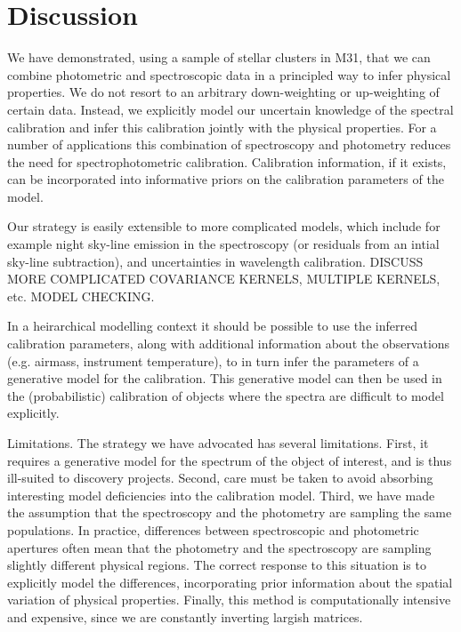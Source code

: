 \documentclass[iop,numberedappendix]{emulateapj}
\begin{document}
\section{Discussion}

We have demonstrated, using a sample of stellar clusters in M31, that
we can combine photometric and spectroscopic data in a principled way
to infer physical properties.  We do not resort to an arbitrary
down-weighting or up-weighting of certain data. Instead, we explicitly
model our uncertain knowledge of the spectral calibration and infer
this calibration jointly with the physical properties. For a number of
applications this combination of spectroscopy and photometry reduces
the need for spectrophotometric calibration.  Calibration information,
if it exists, can be incorporated into informative priors on the
calibration parameters of the model.

Our strategy is easily extensible to more complicated models, which
include for example night sky-line emission in the spectroscopy (or
residuals from an intial sky-line subtraction), and uncertainties in
wavelength calibration. {\color{blue} DISCUSS MORE COMPLICATED
COVARIANCE KERNELS, MULTIPLE KERNELS, etc.  MODEL CHECKING.}

In a heirarchical modelling context it should be possible to use the
inferred calibration parameters, along with additional information
about the observations (e.g. airmass, instrument temperature), to in
turn infer the parameters of a generative model for the
calibration. This generative model can then be used in the
(probabilistic) calibration of objects where the spectra are difficult
to model explicitly.

Limitations.  The strategy we have advocated has several limitations.
First, it requires a generative model for the spectrum of the object
of interest, and is thus ill-suited to discovery projects.  Second,
care must be taken to avoid absorbing interesting model deficiencies
into the calibration model.  Third, we have made the assumption that
the spectroscopy and the photometry are sampling the same populations.
In practice, differences between spectroscopic and photometric
apertures often mean that the photometry and the spectroscopy are sampling
slightly different physical regions.  The correct response to this
situation is to explicitly model the differences, incorporating prior
information about the spatial variation of physical properties.
Finally, this method is computationally intensive and expensive, since
we are constantly inverting largish matrices.
\end{document}
